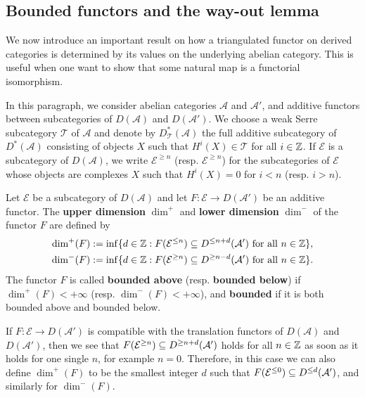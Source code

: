 \subsection{Bounded functors and the way-out lemma}
We now introduce an important result on how a triangulated functor on derived categories is determined by its values on the underlying abelian category. This is useful when one want to show that some natural map is a functorial isomorphism.\par
In this paragraph, we consider abelian categories $\mathcal{A}$ and $\mathcal{A}'$, and additive functors between subcategories of $D(\mathcal{A})$ and $D(\mathcal{A}')$. We choose a weak Serre subcategory $\mathcal{T}$ of $\mathcal{A}$ and denote by $D_\mathcal{T}^*(\mathcal{A})$ the full additive subcategory of $D^*(\mathcal{A})$ consisting of objects $X$ such that $H^i(X)\in\mathcal{T}$ for all $i\in\mathbb{Z}$. If $\mathcal{E}$ is a subcategory of $D(\mathcal{A})$, we write $\mathcal{E}^{\geq n}$ (resp. $\mathcal{E}^{\geq n}$) for the subcategories of $\mathcal{E}$ whose objects are complexes $X$ such that $H^i(X)=0$ for $i<n$ (resp. $i>n$).
\begin{definition}
Let $\mathcal{E}$ be a subcategory of $D(\mathcal{A})$ and let $F:\mathcal{E}\to D(\mathcal{A}')$ be an additive functor. The \textbf{upper dimension} $\dim^+$ and \textbf{lower dimension} $\dim^-$ of the functor $F$ are defined by
\begin{gather*}
\dim^+(F):=\inf\{d\in\mathbb{Z}:\text{$F(\mathcal{E}^{\leq n})\subseteq D^{\leq n+d}(\mathcal{A}')$ for all $n\in\mathbb{Z}$}\},\\
\dim^-(F):=\inf\{d\in\mathbb{Z}:\text{$F(\mathcal{E}^{\geq n})\subseteq D^{\geq n-d}(\mathcal{A}')$ for all $n\in\mathbb{Z}$}\}.
\end{gather*}
The functor $F$ is called \textbf{bounded above} (resp. \textbf{bounded below}) if $\dim^+(F)<+\infty$ (resp. $\dim^-(F)<+\infty$), and \textbf{bounded} if it is both bounded above and bounded below.
\end{definition}

\begin{remark}
If $F:\mathcal{E}\to D(\mathcal{A}')$ is compatible with the translation functors of $D(\mathcal{A})$ and $D(\mathcal{A}')$, then we see that $F(\mathcal{E}^{\geq n})\subseteq D^{\geq n+d}(\mathcal{A}')$ holds for all $n\in\mathbb{Z}$ as soon as it holds for one single $n$, for example $n=0$. Therefore, in this case we can also define $\dim^+(F)$ to be the smallest integer $d$ such that $F(\mathcal{E}^{\leq 0})\subseteq D^{\leq d}(\mathcal{A}')$, and similarly for $\dim^-(F)$.
\end{remark}

